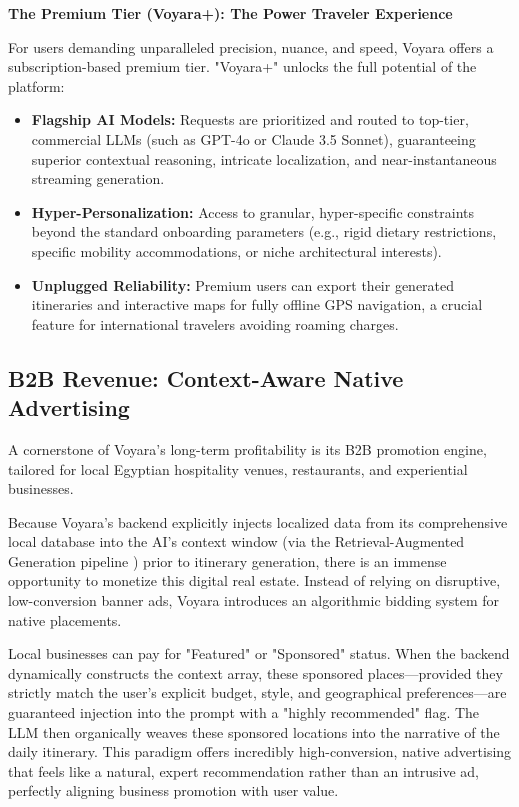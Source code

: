 \textbf{The Premium Tier (Voyara+): The Power Traveler Experience}

For users demanding unparalleled precision, nuance, and speed, Voyara offers a subscription-based premium tier. "Voyara+" unlocks the full potential of the platform:
\begin{itemize}
    \item \textbf{Flagship AI Models:} Requests are prioritized and routed to top-tier, commercial LLMs (such as GPT-4o or Claude 3.5 Sonnet), guaranteeing superior contextual reasoning, intricate localization, and near-instantaneous streaming generation.
    \item \textbf{Hyper-Personalization:} Access to granular, hyper-specific constraints beyond the standard onboarding parameters (e.g., rigid dietary restrictions, specific mobility accommodations, or niche architectural interests).
    \item \textbf{Unplugged Reliability:} Premium users can export their generated itineraries and interactive maps for fully offline GPS navigation, a crucial feature for international travelers avoiding roaming charges.
\end{itemize}

\subsection{B2B Revenue: Context-Aware Native Advertising}
A cornerstone of Voyara's long-term profitability is its B2B promotion engine, tailored for local Egyptian hospitality venues, restaurants, and experiential businesses.

Because Voyara's backend explicitly injects localized data from its comprehensive local database into the AI's context window (via the Retrieval-Augmented Generation pipeline \cite{lewis2020rag}) prior to itinerary generation, there is an immense opportunity to monetize this digital real estate. Instead of relying on disruptive, low-conversion banner ads, Voyara introduces an algorithmic bidding system for native placements.

Local businesses can pay for "Featured" or "Sponsored" status. When the backend dynamically constructs the context array, these sponsored places—provided they strictly match the user's explicit budget, style, and geographical preferences—are guaranteed injection into the prompt with a "highly recommended" flag. The LLM then organically weaves these sponsored locations into the narrative of the daily itinerary. This paradigm offers incredibly high-conversion, native advertising that feels like a natural, expert recommendation rather than an intrusive ad, perfectly aligning business promotion with user value.

